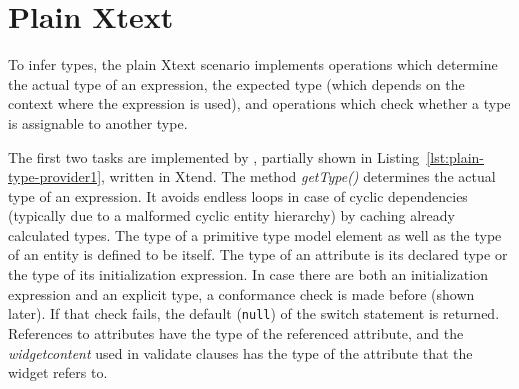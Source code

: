 \section{Plain Xtext}
\label{sec:plain-xtext}

To infer types, the plain Xtext scenario implements operations which determine
the actual type of an expression, the expected type (which depends on the
context where the expression is used), and operations which check whether a type
is assignable to another type.

The first two tasks are implemented by , partially
shown in Listing~\ref{lst:plain-type-provider1}, written in Xtend. The method
\emph{getType()} determines the actual type of an expression. It avoids endless
loops in case of cyclic dependencies (typically due to a malformed cyclic entity
hierarchy) by caching already calculated types.  The type of a primitive type
model element as well as the type of an entity is defined to be itself. The type
of an attribute is its declared type or the type of its initialization
expression.  In case there are both an initialization expression and an explicit type, a
conformance check is made before (shown later). If that
check fails, the default (\verb|null|) of the switch statement is returned.
References to attributes have the type of the referenced attribute, and the
\emph{widgetcontent} used in validate clauses has the type of the attribute that
the widget refers to.


%


